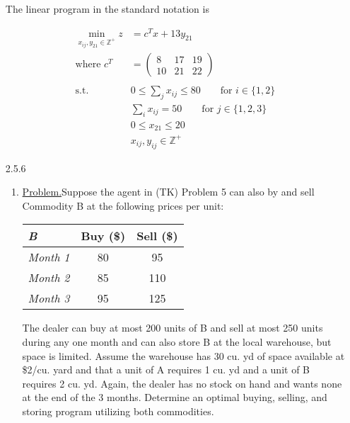 \documentclass{homework}
\newcommand{\st}{\mathrm{s.t.}}
\begin{document}
\begin{enumerate}
		The linear program in the standard notation is
		
		\begin{tcolorbox}
			\vspace{-1em}
			\begin{align*}
				\min_{x_{ij}, y_{21} \in \mathbb{Z}^+}z & = c^T x + 13 y_{21} \\
				\text{where } c^T & = \begin{pmatrix}
					8 & 17 & 19 \\
					10 & 21 & 22
				\end{pmatrix} \\ \\
				\st \qquad & 0 \le \sum_j x_{ij} \le 80  \qquad \text{for } i \in \{ 1, 2\} \\
				&  \sum_i x_{ij} = 50  \qquad \text{for } j \in \{1, 2, 3\} \\
				& 0 \le x_{21} \le 20 \\
				& x_{ij}, y_{ij} \in \mathbb{Z}^+
			\end{align*}
		\end{tcolorbox}
		\item[2.5.6] \begin{enumerate}
			\item \underline{Problem.}\quad Suppose the agent in (TK) Problem 5 can also by and sell Commodity B at the following prices per unit:
			
			\begin{center}
				\begin{tabular}{lcc}
					\toprule
					\textit{B} & Buy (\$) & Sell (\$) \\
					\midrule
					\textit{Month 1} & 80 & 95 \\
					\textit{Month 2} & 85 & 110 \\
					\textit{Month 3} & 95 & 125 \\
					\bottomrule
				\end{tabular}
			\end{center}
			
			The dealer can buy at most 200 units of B and sell at most 250 units during any one month and can also store B at the local warehouse, but space is limited. Assume the warehouse has 30 cu. yd of space available at \$2/cu. yard and that a unit of A requires 1 cu. yd and a unit of B requires 2 cu. yd. Again, the dealer has no stock on hand and wants none at the end of the 3 months. Determine an optimal buying, selling, and storing program utilizing both commodities. 
			

\end{enumerate}
\end{enumerate}
\end{document}
